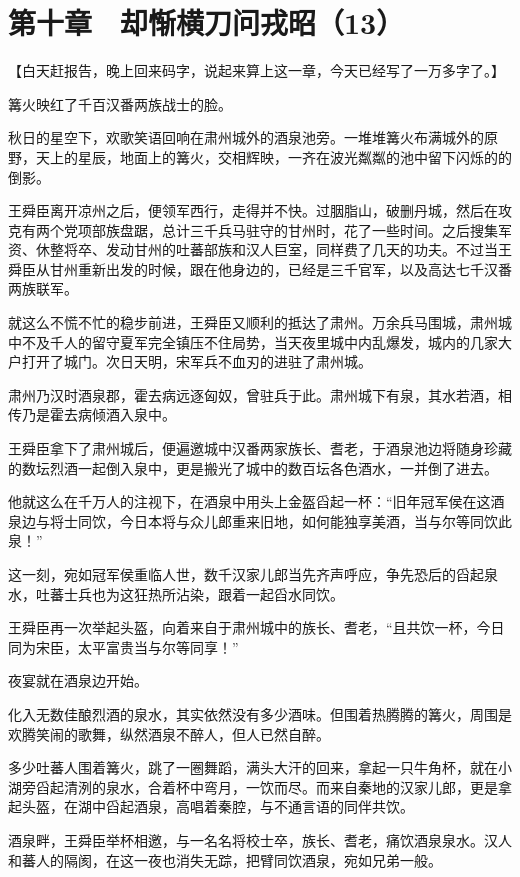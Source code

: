 \section{第十章　却惭横刀问戎昭（13）}

【白天赶报告，晚上回来码字，说起来算上这一章，今天已经写了一万多字了。】

篝火映红了千百汉番两族战士的脸。

秋日的星空下，欢歌笑语回响在肃州城外的酒泉池旁。一堆堆篝火布满城外的原野，天上的星辰，地面上的篝火，交相辉映，一齐在波光粼粼的池中留下闪烁的的倒影。

王舜臣离开凉州之后，便领军西行，走得并不快。过胭脂山，破删丹城，然后在攻克有两个党项部族盘踞，总计三千兵马驻守的甘州时，花了一些时间。之后搜集军资、休整将卒、发动甘州的吐蕃部族和汉人巨室，同样费了几天的功夫。不过当王舜臣从甘州重新出发的时候，跟在他身边的，已经是三千官军，以及高达七千汉番两族联军。

就这么不慌不忙的稳步前进，王舜臣又顺利的抵达了肃州。万余兵马围城，肃州城中不及千人的留守夏军完全镇压不住局势，当天夜里城中内乱爆发，城内的几家大户打开了城门。次日天明，宋军兵不血刃的进驻了肃州城。

肃州乃汉时酒泉郡，霍去病远逐匈奴，曾驻兵于此。肃州城下有泉，其水若酒，相传乃是霍去病倾酒入泉中。

王舜臣拿下了肃州城后，便遍邀城中汉番两家族长、耆老，于酒泉池边将随身珍藏的数坛烈酒一起倒入泉中，更是搬光了城中的数百坛各色酒水，一并倒了进去。

他就这么在千万人的注视下，在酒泉中用头上金盔舀起一杯：“旧年冠军侯在这酒泉边与将士同饮，今日本将与众儿郎重来旧地，如何能独享美酒，当与尔等同饮此泉！”

这一刻，宛如冠军侯重临人世，数千汉家儿郎当先齐声呼应，争先恐后的舀起泉水，吐蕃士兵也为这狂热所沾染，跟着一起舀水同饮。

王舜臣再一次举起头盔，向着来自于肃州城中的族长、耆老，“且共饮一杯，今日同为宋臣，太平富贵当与尔等同享！”

夜宴就在酒泉边开始。

化入无数佳酿烈酒的泉水，其实依然没有多少酒味。但围着热腾腾的篝火，周围是欢腾笑闹的歌舞，纵然酒泉不醉人，但人已然自醉。

多少吐蕃人围着篝火，跳了一圈舞蹈，满头大汗的回来，拿起一只牛角杯，就在小湖旁舀起清洌的泉水，合着杯中弯月，一饮而尽。而来自秦地的汉家儿郎，更是拿起头盔，在湖中舀起酒泉，高唱着秦腔，与不通言语的同伴共饮。

酒泉畔，王舜臣举杯相邀，与一名名将校士卒，族长、耆老，痛饮酒泉泉水。汉人和蕃人的隔阂，在这一夜也消失无踪，把臂同饮酒泉，宛如兄弟一般。

